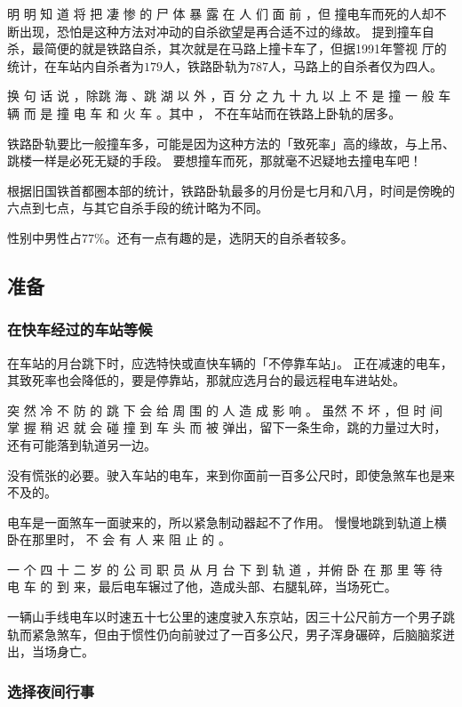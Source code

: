 \documentclass[UTF8]{ctexart}
\begin{document}
明 明 知 道 将 把 凄 惨 的 尸 体 暴 露 在 人 们 面 前 ，但 撞电车而死的人却不断出现，恐怕是这种方法对冲动的自杀欲望是再合适不过的缘故。 提到撞车自杀，最简便的就是铁路自杀，其次就是在马路上撞卡车了，但据1991年警视 厅的统计，在车站内自杀者为$179$人，铁路卧轨为$787$人，马路上的自杀者仅为四人。

换 句 话 说 ，除跳 海 、跳 湖 以 外 ，百 分 之 九 十 九 以 上 不 是 撞 一 般 车 辆 而 是 撞 电 车 和 火 车 。其中 ， 不在车站而在铁路上卧轨的居多。

铁路卧轨要比一般撞车多，可能是因为这种方法的「致死率」高的缘故，与上吊、跳楼一样是必死无疑的手段。
要想撞车而死，那就毫不迟疑地去撞电车吧！

根据旧国铁首都圈本部的统计，铁路卧轨最多的月份是七月和八月，时间是傍晚的六点到七点，与其它自杀手段的统计略为不同。

性别中男性占$77\%$。还有一点有趣的是，选阴天的自杀者较多。

\subsection{准备}

\subsubsection*{在快车经过的车站等候}

在车站的月台跳下时，应选特快或直快车辆的「不停靠车站」。
正在减速的电车，其致死率也会降低的，要是停靠站，那就应选月台的最远程电车进站处。

突 然 冷 不 防 的 跳 下 会 给 周 围 的 人 造 成 影 响 。
虽然 不 坏 ，但 时 间 掌 握 稍 迟 就 会 碰 撞 到 车 头 而 被 弹出，留下一条生命，跳的力量过大时，还有可能落到轨道另一边。

没有慌张的必要。驶入车站的电车，来到你面前一百多公尺时，即使急煞车也是来不及的。 

电车是一面煞车一面驶来的，所以紧急制动器起不了作用。
慢慢地跳到轨道上横卧在那里时， 不 会 有 人 来 阻 止 的 。

一 个 四 十 二 岁 的 公 司 职 员 从 月 台 下 到 轨 道 ，并俯 卧 在 那 里 等 待 电 车 的 到 来，最后电车辗过了他，造成头部、右腿轧碎，当场死亡。 

一辆山手线电车以时速五十七公里的速度驶入东京站，因三十公尺前方一个男子跳轨而紧急煞车，但由于惯性仍向前驶过了一百多公尺，男子浑身碾碎，后脑脑浆迸出，当场身亡。

\subsubsection*{选择夜间行事}
\end{document}
